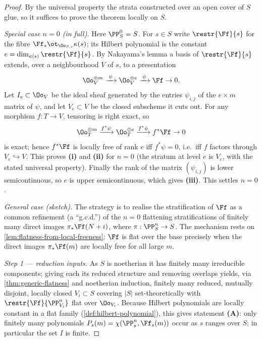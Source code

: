\begin{proof}
  By the universal property the strata constructed over an open cover of \(S\)
  glue, so it suffices to prove the theorem locally on \(S\).

  \emph{Special case \(n=0\) (in full).} Here \(\PP^0_S=S\). For \(s\in S\) write
  \(\restr{\Ff}{s}\) for the fibre \(\Ff_s\ot_{\Oo_{S,s}}\kappa(s)\); its Hilbert
  polynomial is the constant \(e=\dim_{\kappa(s)}\restr{\Ff}{s}\). By Nakayama's
  lemma a basis of \(\restr{\Ff}{s}\) extends, over a neighbourhood \(V\) of
  \(s\), to a presentation
  \[
    \Oo_V^{\oplus m}\xrightarrow{\;\psi\;}\Oo_V^{\oplus e}
      \xrightarrow{\;\phi\;}\Ff\to 0 .
  \]
  Let \(I_e\subset\Oo_V\) be the ideal sheaf generated by the entries
  \(\psi_{i,j}\) of the \(e\times m\) matrix of \(\psi\), and let \(V_e\subset V\)
  be the closed subscheme it cuts out. For any morphism \(f:T\to V\), tensoring
  is right exact, so
  \[
    \Oo_T^{\oplus m}\xrightarrow{f^*\psi}\Oo_T^{\oplus e}
      \xrightarrow{f^*\phi} f^*\Ff\to 0
  \]
  is exact; hence \(f^*\Ff\) is locally free of rank \(e\) iff \(f^*\psi=0\),
  i.e.\ iff \(f\) factors through \(V_e\hookrightarrow V\). This proves
  \textbf{(i)} and \textbf{(ii)} for \(n=0\) (the stratum at level \(e\) is
  \(V_e\), with the stated universal property). Finally the rank of the matrix
  \((\psi_{i,j})\) is lower semicontinuous, so \(e\) is upper semicontinuous,
  which gives \textbf{(iii)}. This settles \(n=0\).

  \emph{General case (sketch).} The strategy is to realise the stratification of
  \(\Ff\) as a common refinement (a ``g.c.d.'') of the \(n=0\) flattening
  stratifications of finitely many direct images \(\pi_*\Ff(N+i)\), where
  \(\pi:\PP^n_S\to S\). The mechanism rests on \cref{lem:flatness-from-local-freeness}:
  \(\Ff\) is flat over the base precisely when the direct images
  \(\pi_*\Ff(m)\) are locally free for all large \(m\).

  \emph{Step 1 — reduction inputs.} As \(S\) is noetherian it has finitely many
  irreducible components; giving each its reduced structure and removing overlaps
  yields, via \cref{thm:generic-flatness} and noetherian induction, finitely many
  reduced, mutually disjoint, locally closed \(V_i\subset S\) covering \(|S|\)
  set-theoretically with \(\restr{\Ff}{\PP^n_{V_i}}\) flat over \(\Oo_{V_i}\).
  Because Hilbert polynomials are locally constant in a flat family
  (\cref{def:hilbert-polynomial}), this gives statement \textbf{(A)}: only
  finitely many polynomials \(P_s(m)=\chi(\PP^n_s,\Ff_s(m))\) occur as \(s\)
  ranges over \(S\); in particular the set \(I\) is finite.


\end{proof}
